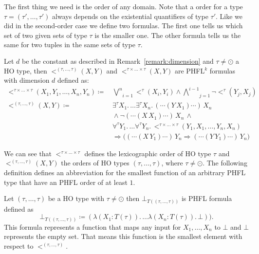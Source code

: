 The first thing we need is the order of any domain. Note that a order for a type $\tau = (\tau', \dots, \tau')$ always
depends on the existential quantifiers of type $\tau'$. Like we did in the second-order case we define two formulas. The first
one tells us which set of two given sets of type $\tau$ is the smaller one. The other formula tells us the same for two
tuples in the same sets of type $\tau$.

\begin{definition}
    \label{definition:lower_bound_less_higher}
    Let $d$ be the constant as described in Remark~\ref{remark:dimension} and $\tau \neq \odot$ a HO
    type, then $<^{(\tau, \dots, \tau)}(X, Y)$ and $<^{\tau \times \dots \times \tau}(X, Y)$ are PHFL$^k$ formulas
    with dimension $d$ defined as:
    \begin{align*}
        <^{\tau \times \dots \times \tau}(X_1, Y_1, \dots, X_n, Y_n) \coloneqq &\,\underset{i =
        1}{\overset{n}{\bigvee}}<^{\tau}(X_i, Y_i) \wedge \underset{j = 1}{\overset{i - 1}{\bigwedge}}
        \neg <^{\tau}(Y_j, X_j)\\
        <^{(\tau, \dots, \tau)}(X, Y) \coloneqq &\,\exists^{\tau}X_1. \,\dots \exists^{\tau}X_n.\,(\dotsb(Y\,X_1)\dotsb)\,X_n\\
        &\,\wedge \neg (\dotsb(X\,X_1) \dotsb)\,X_n\,\wedge \\&\,\forall^{\tau}Y_1. \,\dots
        \forall^{\tau}Y_n.\,<^{\tau \times \dots \times \tau}
        (Y_1, X_1, \dots, Y_n, X_n) \\&\,\Rightarrow \big((\dotsb(X\,Y_1) \dotsb)\,Y_n \Rightarrow (\dotsb(Y\,Y_1)
         \dotsb)\,Y_n\big)
    \end{align*}
\end{definition}
We can see that $<^{\tau \times \dots \times \tau}$ defines the lexicographic order of HO type $\tau$ and $<^{(\tau, \dots, \tau)}(X, Y)$ the orders of HO types $(\tau, \dots, \tau)$, where $\tau \neq \odot$. The following definition defines an abbreviation for the smallest function of an arbitrary PHFL type that have an PHFL order of at least $1$.

\begin{definition} 
\label{definition:smallest}
	Let $(\tau, \dots, \tau)$ be a HO type with $\tau \neq \odot$ then $\bot_{T((\tau, \dots, \tau))}$ is PHFL formula defined as
	\[\bot_{T((\tau, \dots, \tau))} \coloneqq (\lambda (X_1 \colon T(\tau)).\, \dots \lambda (X_n \colon T(\tau)).\,\bot)).\] 
    This formula represents a function that maps any input for $X_1, \dots, X_n$ to $\bot$ and $\bot$ 
    represents the empty set. That means this function is the smallest element with respect to $<^{(\tau, \dots, \tau)}$.
\end{definition}

